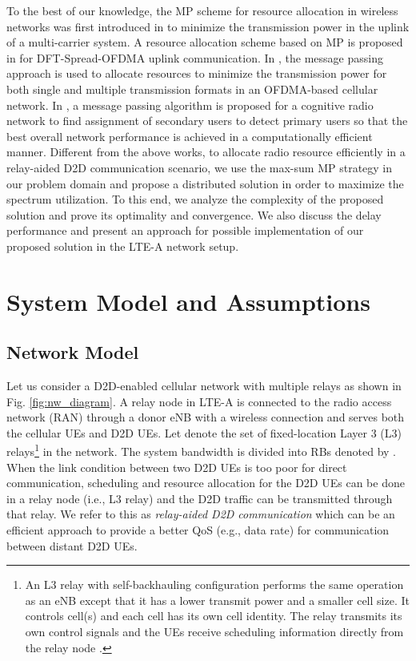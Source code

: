 \documentclass[twocolumn,10pt]{IEEEtran}
\begin{document}
To the best of our knowledge, the MP scheme for resource allocation in wireless networks was first introduced in \cite{mp-icc-09} to minimize the transmission power in the uplink of a multi-carrier system. A resource allocation scheme based on MP is proposed in \cite{mp-dft} for DFT-Spread-OFDMA uplink communication. In \cite{mp-twireless}, the message passing approach is used to allocate resources to minimize the transmission power for both single and multiple transmission formats in an OFDMA-based cellular network. In \cite{cr-pgm-jsac}, a message passing algorithm is proposed for a cognitive radio network to find assignment of secondary users to detect primary users so that the best overall network performance is achieved in a computationally efficient manner. Different from the above works, to allocate radio resource efficiently in a relay-aided D2D communication scenario, we use the max-sum MP strategy in our problem domain and propose a distributed solution in order to maximize the spectrum utilization. To this end, we analyze the complexity of the proposed solution and prove its optimality and convergence. We also discuss the delay performance and present an approach for possible implementation of our proposed solution in the LTE-A network setup. 

\section{System Model and Assumptions} \label{sec:sys_model}

\subsection{Network Model}

Let us consider a D2D-enabled  cellular network with multiple relays as shown in Fig. \ref{fig:nw_diagram}. A relay node in LTE-A is connected to the radio access network (RAN) through a donor eNB with a wireless connection and serves  both the cellular UEs and D2D UEs. Let  denote the set of fixed-location Layer 3 (L3) relays\footnote{An L3 relay with self-backhauling configuration performs the same operation as an eNB except that it has a lower transmit power and a smaller cell size. It controls cell(s) and each cell has its own cell identity. The relay transmits its own control signals and the UEs receive scheduling information directly from the relay node \cite{relay-book-1}.} in the network. The system bandwidth is divided into  RBs denoted by . When the link condition between two D2D UEs is too poor for direct communication,  scheduling and resource allocation for the D2D UEs can be done in a relay node (i.e., L3 relay) and the D2D traffic can be transmitted through that relay. We refer to this as \textit{relay-aided D2D communication} which can be an efficient approach to provide a better QoS  (e.g., data rate) for communication between distant D2D UEs.
\end{document}
